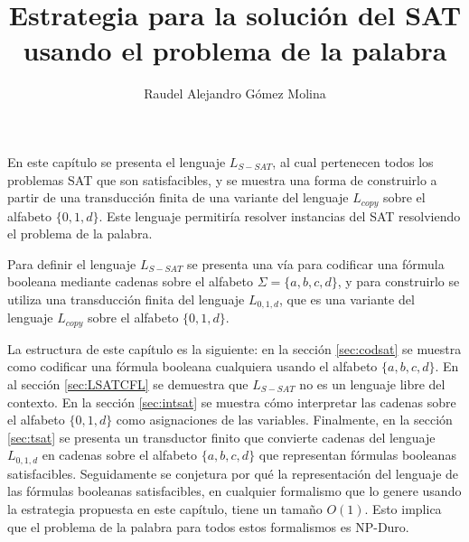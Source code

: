 \documentclass[12pt]{article}
\title{Estrategia para la solución del SAT usando el problema de la palabra}
\author{Raudel Alejandro Gómez Molina}
\begin{document}
\maketitle





En este capítulo se presenta el lenguaje $L_{S-SAT}$, al cual pertenecen todos los problemas SAT que son 
satisfacibles, y se muestra una forma de construirlo a partir de una transducción finita de una variante 
del lenguaje $L_{copy}$ sobre el alfabeto $\{0,1,d\}$. Este lenguaje permitiría resolver instancias del SAT resolviendo el problema de la palabra.  

Para definir el lenguaje $L_{S-SAT}$ se presenta una vía para codificar una fórmula booleana mediante cadenas sobre el alfabeto $\Sigma=\{a, b,c,d\}$, y para construirlo se utiliza una transducción finita del lenguaje $L_{0,1,d}$, que es una variante del lenguaje $L_{copy}$ sobre el alfabeto $\{0,1,d\}$.

La estructura de este capítulo es la siguiente: en la sección \ref{sec:codsat} se muestra como codificar 
una fórmula booleana cualquiera usando el alfabeto $\{a,b,c,d\}$. 
En al sección \ref{sec:LSATCFL} se demuestra que $L_{S-SAT}$ no es un lenguaje libre del contexto.
En la sección \ref{sec:intsat} se muestra cómo interpretar las cadenas sobre el alfabeto $\{0,1,d\}$ como asignaciones de las variables. Finalmente, en la sección \ref{sec:tsat} se presenta un transductor finito que convierte cadenas del lenguaje $L_{0,1,d}$ en cadenas sobre el alfabeto $\{a,b,c,d\}$ que representan fórmulas booleanas satisfacibles. Seguidamente se conjetura por qué la representación del lenguaje de las fórmulas booleanas satisfacibles, en cualquier formalismo que lo genere usando la estrategia propuesta en este capítulo, tiene un tamaño $O(1)$. Esto implica que el problema de la palabra para todos estos formalismos es NP-Duro.
\end{document}
